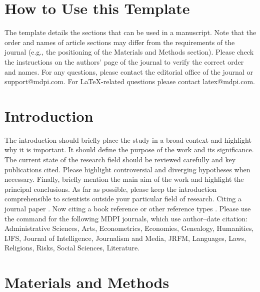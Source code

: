 \documentclass[engproc,conferenceproceedings,submit,pdftex,moreauthors]{Definitions/mdpi}
\begin{document}
\setcounter{section}{-1} %
\section{How to Use this Template}

The template details the sections that can be used in a manuscript. Note that the order and names of article sections may differ from the requirements of the journal (e.g., the positioning of the Materials and Methods section). Please check the instructions on the authors' page of the journal to verify the correct order and names. For any questions, please contact the editorial office of the journal or support@mdpi.com. For LaTeX-related questions please contact latex@mdpi.com.%


\section{Introduction}

The introduction should briefly place the study in a broad context and highlight why it is important. It should define the purpose of the work and its significance. The current state of the research field should be reviewed carefully and key publications cited. Please highlight controversial and diverging hypotheses when necessary. Finally, briefly mention the main aim of the work and highlight the principal conclusions. As far as possible, please keep the introduction comprehensible to scientists outside your particular field of research. Citing a journal paper \cite{ref-journal}. Now citing a book reference \cite{ref-book1,ref-book2} or other reference types \cite{ref-unpublish,ref-communication,ref-proceeding}. Please use the command \citep{ref-thesis,ref-url} for the following MDPI journals, which use author--date citation: Administrative Sciences, Arts, Econometrics, Economies, Genealogy, Humanities, IJFS, Journal of Intelligence, Journalism and Media, JRFM, Languages, Laws, Religions, Risks, Social Sciences, Literature.
\section{Materials and Methods}
\end{document}

